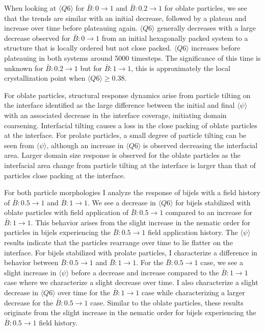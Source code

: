 When looking at $\langle Q6 \rangle$ for $\bar{B}: 0 \rightarrow 1$
and $\bar{B}: 0.2 \rightarrow 1$ for oblate particles, we see that the
trends are similar with an initial decrease, followed by a plateau and
increase over time before plateauing again. $\langle Q6 \rangle$
generally decreases with a large decrease observed for
\(\bar{B}: 0 \rightarrow 1\) from an initial hexagonally packed system
to a structure that is locally ordered but not close packed. $\langle Q6 \rangle$ increases before plateauing 
in both systems around 5000 timesteps. The significance of
this time is unknown for $\bar{B}: 0.2 \rightarrow 1$ but for
$\bar{B}: 1 \rightarrow 1$, this is approximately the local
crystallization point when $\langle Q6 \rangle \geq 0.38$.

For oblate particles, structural response dynamics
arise from particle tilting on the interface identified as the large
difference between the initial and final $\langle \psi \rangle$ with
an associated decrease in the interface coverage, initiating domain
coarsening. Interfacial tilting causes a loss in the
close packing of oblate particles at the interface. For prolate
particles, a small degree of particle tilting can be seen
from $\langle \psi \rangle$, although an increase in $\langle Q6 \rangle$ is observed
decreasing the interfacial area. Larger domain size response is
observed for the oblate particles as the interfacial area change from
particle tilting at the interface is larger than that of particles close
packing at the interface.

For both particle morphologies I analyze the response of bijels with a
field history of $\bar{B}: 0.5 \rightarrow 1$ and
$\bar{B}: 1 \rightarrow 1$. We see a decrease in
$\langle Q6 \rangle$ for bijels stabilized with oblate particles with
field application of $\bar{B}: 0.5 \rightarrow 1$ compared to an
increase for $\bar{B}: 1 \rightarrow 1$. This behavior arises from the
slight increase in the nematic order for particles in bijels
experiencing the $\bar{B}: 0.5 \rightarrow 1$ field application
history. The $\langle \psi \rangle$ results indicate that the
particles rearrange over time to lie flatter on the interface. For
bijels stabilized with prolate particles, I characterize a difference
in behavior between $\bar{B}: 0.5 \rightarrow 1$ and
$\bar{B}: 1 \rightarrow 1$. For the $\bar{B}: 0.5 \rightarrow 1$
case, we see a slight increase in $\langle \psi \rangle$ before a
decrease and increase compared to the $\bar{B}: 1 \rightarrow 1$ case
where we characterize a slight decrease over time. I also characterize
a slight decrease in $\langle Q6 \rangle$ over time for the
$\bar{B}: 1 \rightarrow 1$ case while characterizing a larger decrease
for the $\bar{B}: 0.5 \rightarrow 1$ case. Similar to the oblate
particles, these results originate from the slight increase in the
nematic order for bijels experiencing the $\bar{B}: 0.5 \rightarrow 1$
field history.

